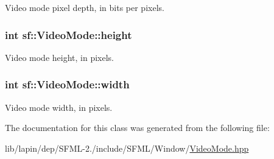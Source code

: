 Video mode pixel depth, in bits per pixels. 

\hypertarget{classsf_1_1_video_mode_a5a88d44c9470db7474361a42a189342d}{
\subsubsection[{height}]{ {\bf int} sf\-::\-Video\-Mode\-::height}}\label{classsf_1_1_video_mode_a5a88d44c9470db7474361a42a189342d}


Video mode height, in pixels. 

\hypertarget{classsf_1_1_video_mode_a9b3b2ad2cac6b9c266823fb5ed506d90}{
\subsubsection[{width}]{ {\bf int} sf\-::\-Video\-Mode\-::width}}\label{classsf_1_1_video_mode_a9b3b2ad2cac6b9c266823fb5ed506d90}


Video mode width, in pixels. 



The documentation for this class was generated from the following file\-:\begin{DoxyCompactItemize}
\item 
lib/lapin/dep/\-S\-F\-M\-L-\/2./include/\-S\-F\-M\-L/\-Window/\hyperlink{lapin_2dep_2_s_f_m_l-2_83_2include_2_s_f_m_l_2_window_2_video_mode_8hpp}{Video\-Mode.\-hpp}\end{DoxyCompactItemize}
